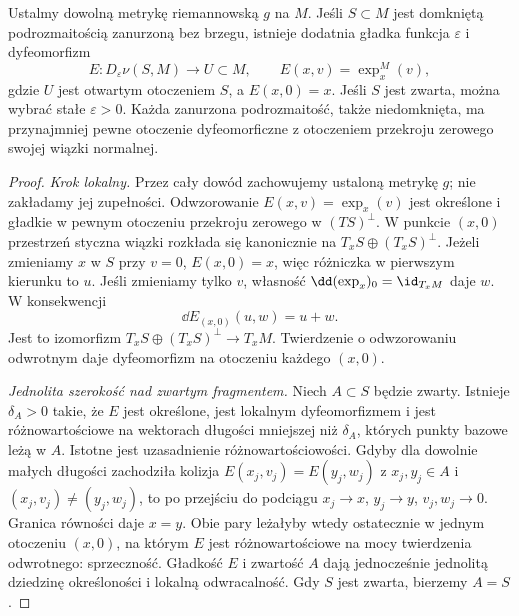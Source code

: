\begin{twierdzenie}
\label{thm:otoczenie-tubularne}
Ustalmy dowolną metrykę riemannowską $g$ na $M$.
Jeśli $S\subset M$ jest domkniętą podrozmaitością
zanurzoną bez brzegu, istnieje dodatnia gładka
funkcja $\varepsilon$ i dyfeomorfizm
\[
 E:D_\varepsilon\nu(S,M)\longrightarrow U\subset M,
 \qquad E(x,v)=\exp_x^M(v),
\]
gdzie $U$ jest otwartym otoczeniem $S$,
a $E(x,0)=x$. Jeśli $S$ jest zwarta,
można wybrać stałe $\varepsilon>0$.
Każda zanurzona podrozmaitość, także
niedomknięta, ma przynajmniej pewne
otoczenie dyfeomorficzne z otoczeniem
przekroju zerowego swojej wiązki normalnej.
\end{twierdzenie}
\begin{proof}
\emph{Krok lokalny.} Przez cały dowód zachowujemy
ustaloną metrykę $g$; nie zakładamy jej zupełności.
Odwzorowanie
$E(x,v)=\exp_x(v)$ jest określone i gładkie
w pewnym otoczeniu przekroju zerowego
w $(TS)^\perp$. W punkcie $(x,0)$
przestrzeń styczna wiązki rozkłada się
kanonicznie na $T_xS\oplus(T_xS)^\perp$.
Jeżeli zmieniamy $x$ w $S$ przy $v=0$,
$E(x,0)=x$, więc różniczka w pierwszym
kierunku to $u$. Jeśli zmieniamy tylko
$v$, własność
$\dd(\exp_x)_0=\id_{T_xM}$ daje $w$.
W konsekwencji
\begin{equation}\label{eq:tuba-rozniczka}
 \dd E_{(x,0)}(u,w)=u+w.
\end{equation}
Jest to izomorfizm
$T_xS\oplus(T_xS)^\perp\to T_xM$.
Twierdzenie o odwzorowaniu odwrotnym
daje dyfeomorfizm na otoczeniu
każdego $(x,0)$.

\emph{Jednolita szerokość nad zwartym
fragmentem.} Niech $A\subset S$ będzie
zwarty. Istnieje $\delta_A>0$ takie, że
$E$ jest określone, jest lokalnym
dyfeomorfizmem i jest różnowartościowe
na wektorach długości mniejszej niż
$\delta_A$, których punkty bazowe
leżą w $A$. Istotne jest uzasadnienie
różnowartościowości. Gdyby dla dowolnie
małych długości zachodziła kolizja
$E(x_j,v_j)=E(y_j,w_j)$ z $x_j,y_j\in A$
i $(x_j,v_j)\ne(y_j,w_j)$, to po
przejściu do podciągu
$x_j\to x$, $y_j\to y$, $v_j,w_j\to0$.
Granica równości daje $x=y$.
Obie pary leżałyby wtedy ostatecznie
w jednym otoczeniu $(x,0)$, na którym
$E$ jest różnowartościowe na mocy
twierdzenia odwrotnego: sprzeczność.
Gładkość $E$ i zwartość $A$ dają
jednocześnie jednolitą dziedzinę
określoności i lokalną odwracalność.
Gdy $S$ jest zwarta, bierzemy $A=S$.


\end{proof}
